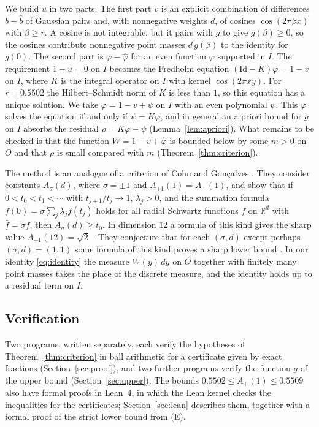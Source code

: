 \documentclass[11pt]{amsart}
\theoremstyle{definition}
\theoremstyle{remark}
\numberwithin{equation}{section}
\newcommand{\R}{\mathbb{R}}
\newcommand{\Id}{\mathrm{Id}}
\newcommand{\ft}[1]{\widehat{#1}}
\newcommand{\Ap}{A_+(1)}
\newcommand{\rdec}{0.5502}
\newcommand{\rPdec}{0.5509}
\begin{document}
We build $u$ in two parts. The first part $v$ is an explicit combination of differences $b-\ft b$ of Gaussian pairs and, with nonnegative weights $d$, of cosines $\cos(2\pi\beta x)$ with $\beta\ge r$. A cosine is not integrable, but it pairs with $g$ to give $g(\beta)\ge0$, so the cosines contribute nonnegative point masses $d\,g(\beta)$ to the identity for $g(0)$. The second part is $\varphi-\ft\varphi$ for an even function $\varphi$ supported in $I$. The requirement $1-u=0$ on $I$ becomes the Fredholm equation $(\Id-K)\varphi=1-v$ on $I$, where $K$ is the integral operator on $I$ with kernel $\cos(2\pi xy)$. For $r=\rdec$ the Hilbert--Schmidt norm of $K$ is less than $1$, so this equation has a unique solution. We take $\varphi=1-v+\psi$ on $I$ with an even polynomial $\psi$. This $\varphi$ solves the equation if and only if $\psi=K\varphi$, and in general an a priori bound for $g$ on $I$ absorbs the residual $\rho=K\varphi-\psi$ (Lemma~\ref{lem:apriori}). What remains to be checked is that the function $W=1-v+\ft\varphi$ is bounded below by some $m>0$ on $O$ and that $\rho$ is small compared with $m$ (Theorem~\ref{thm:criterion}).

The method is an analogue of a criterion of Cohn and Gon\c{c}alves \cite[Proposition~2.4]{CG19}. They consider constants $A_\sigma(d)$, where $\sigma=\pm1$ and $A_{+1}(1)=\Ap$, and show that if $0<t_0<t_1<\cdots$ with $t_{j+1}/t_j\to1$, $\lambda_j>0$, and the summation formula $f(0)=\sigma\sum_j\lambda_jf(t_j)$ holds for all radial Schwartz functions $f$ on $\R^d$ with $\ft f=\sigma f$, then $A_\sigma(d)\ge t_0$. In dimension $12$ a formula of this kind gives the sharp value $A_{+1}(12)=\sqrt2$ \cite{CG19}. They conjecture that for each $(\sigma,d)$ except perhaps $(\sigma,d)=(1,1)$ some formula of this kind proves a sharp lower bound \cite[Conjecture~2.5]{CG19}. In our identity \eqref{eq:identity} the measure $W(y)\,dy$ on $O$ together with finitely many point masses takes the place of the discrete measure, and the identity holds up to a residual term on $I$.

\subsection*{Verification}
Two programs, written separately, each verify the hypotheses of Theorem~\ref{thm:criterion} in ball arithmetic \cite{Joh17} for a certificate given by exact fractions (Section~\ref{sec:proof}), and two further programs verify the function $g$ of the upper bound (Section~\ref{sec:upper}). The bounds $\rdec\le\Ap\le\rPdec$ also have formal proofs in Lean~4, in which the Lean kernel checks the inequalities for the certificates; Section~\ref{sec:lean} describes them, together with a formal proof of the strict lower bound from \textup{(E)}.
\end{document}
